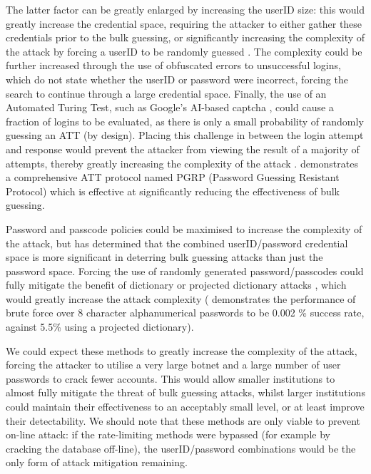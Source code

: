 \documentclass[british,11pt,a4paper]{article}
\begin{document}
The latter factor can be greatly enlarged by increasing the userID size: this would greatly increase the credential space, requiring the attacker to either gather these credentials prior to the bulk guessing, or significantly increasing the complexity of the attack by forcing a userID to be randomly guessed \cite{Kosamkar_undated-ik}. The complexity could be further increased through the use of obfuscated errors to unsuccessful logins, which do not state whether the userID or password were incorrect, forcing the search to continue through a large credential space. Finally, the use of an Automated Turing Test, such as Google's AI-based captcha \cite{noauthor_undated-lk}, could cause a fraction of logins to be evaluated, as there is only a small probability of randomly guessing an ATT (by design). Placing this challenge in between the login attempt and response would prevent the attacker from viewing the result of a majority of attempts, thereby greatly increasing the complexity of the attack \cite{Alsaleh2012-ek}. \citet{Alsaleh2012-ek} demonstrates a comprehensive ATT protocol named PGRP (Password Guessing Resistant Protocol) which is effective at significantly reducing the effectiveness of bulk guessing.

Password and passcode policies could be maximised to increase the complexity of the attack, but \citet{Florencio2007-yp} has determined that the combined userID/password credential space is more significant in deterring bulk guessing attacks than just the password space. Forcing the use of randomly generated password/passcodes could fully mitigate the benefit of dictionary or projected dictionary attacks \cite{Kosamkar_undated-ik}, which would greatly increase the attack complexity (\citet{Aspinall2013-sh} demonstrates the performance of brute force over 8 character alphanumerical passwords to be 0.002 \% success rate, against 5.5\% using a projected dictionary).

We could expect these methods to greatly increase the complexity of the attack, forcing the attacker to utilise a very large botnet and a large number of user passwords to crack fewer accounts. This would allow smaller institutions to almost fully mitigate the threat of bulk guessing attacks, whilst larger institutions could maintain their effectiveness to an acceptably small level, or at least improve their detectability. We should note that these methods are only viable to prevent on-line attack: if the rate-limiting methods were bypassed (for example by cracking the database off-line), the userID/password combinations would be the only form of attack mitigation remaining.
\end{document}
